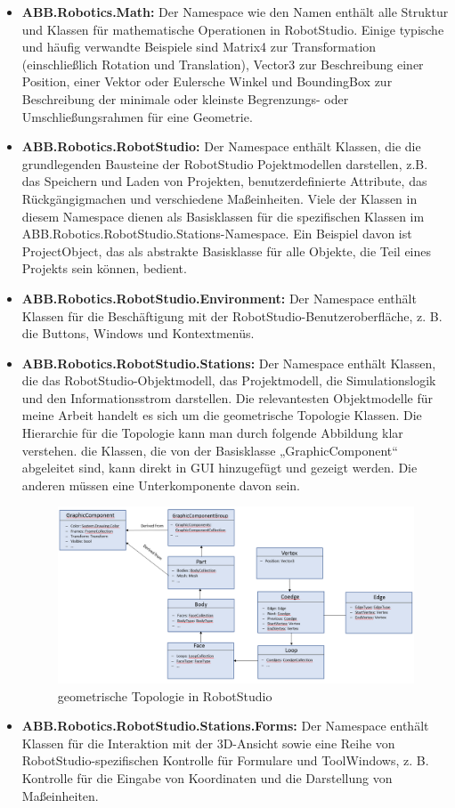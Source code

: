 \documentclass[14pt,a4paper,titlepage]{article}
\begin{document}
			\begin{itemize}
				\item
				\textbf{ABB.Robotics.Math:}
				Der Namespace wie den Namen enthält alle Struktur und Klassen für mathematische Operationen in RobotStudio. Einige typische und häufig verwandte Beispiele sind Matrix4 zur Transformation (einschließlich Rotation und Translation), Vector3 zur Beschreibung einer Position, einer Vektor oder Eulersche Winkel und BoundingBox zur Beschreibung der minimale oder kleinste Begrenzungs- oder Umschließungsrahmen für eine Geometrie. 
				
				\item
				\textbf{ABB.Robotics.RobotStudio:}
				Der Namespace enthält Klassen, die die grundlegenden Bausteine der RobotStudio Pojektmodellen darstellen, z.B. das Speichern und Laden von Projekten, benutzerdefinierte Attribute, das Rückgängigmachen und verschiedene Maßeinheiten. Viele der Klassen in diesem Namespace dienen als Basisklassen für die spezifischen Klassen im ABB.Robotics.RobotStudio.Stations-Namespace. Ein Beispiel davon ist ProjectObject, das als abstrakte Basisklasse für alle Objekte,  die Teil eines Projekts sein können, bedient.
				
				\item
				\textbf{ABB.Robotics.RobotStudio.Environment:}
				Der Namespace enthält Klassen für die Beschäftigung mit der RobotStudio-Benutzeroberfläche, z. B. die Buttons, Windows und Kontextmenüs.
				
				\item
				\textbf{ABB.Robotics.RobotStudio.Stations:}
				Der Namespace enthält Klassen, die das RobotStudio-Objektmodell, das Projektmodell, die Simulationslogik und den Informationsstrom darstellen. Die relevantesten Objektmodelle für meine Arbeit handelt es sich um die geometrische Topologie Klassen. Die Hierarchie für die Topologie kann man durch folgende Abbildung klar verstehen. die Klassen, die von der Basisklasse „GraphicComponent“ abgeleitet sind, kann direkt in GUI hinzugefügt und gezeigt werden. Die anderen müssen eine Unterkomponente davon sein. 

				\begin{figure}[h!]
					\centering
					\includegraphics[width=0.8\linewidth]{TopologyRobotStudio.png}
					\caption{geometrische Topologie in RobotStudio}
				\end{figure}
				\item
				\textbf{ABB.Robotics.RobotStudio.Stations.Forms:}
				Der Namespace enthält Klassen für die Interaktion mit der 3D-Ansicht sowie eine Reihe von RobotStudio-spezifischen Kontrolle für Formulare und ToolWindows, z. B. Kontrolle für die Eingabe von Koordinaten und die Darstellung von Maßeinheiten.
			\end{itemize}
\end{document}

